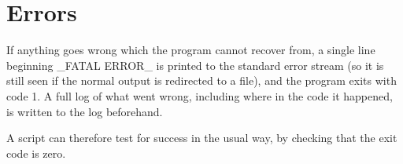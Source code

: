 \section{Errors}

	If anything goes wrong which the program cannot recover from, a single line beginning _FATAL ERROR_ is printed to the standard error stream (so it is still seen if the normal output is redirected to a file), and the program exits with code 1. A full log of what went wrong, including where in the code it happened, is written to the log beforehand.

	A script can therefore test for success in the usual way, by checking that the exit code is zero.
